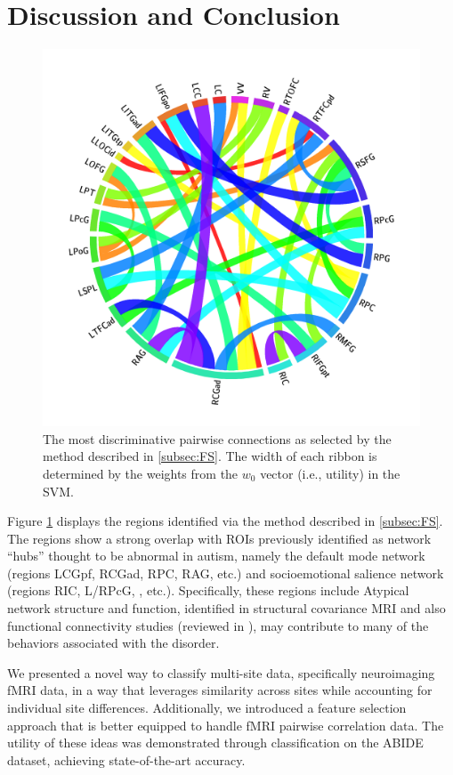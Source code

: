 \documentclass{llncs}
\begin{document}
\section{Discussion and Conclusion}
\begin{figure}
	\centering
	\includegraphics[scale = .15]{now_circos3.png}
	\caption{The most discriminative pairwise connections as selected by the method described in \ref{subsec:FS}.  The width of each ribbon is determined by the weights from the $w_0$ vector (i.e., utility) in the SVM. }
	\label{fig:circos}
\end{figure}

Figure \ref{fig:circos} displays the regions identified via the method described in  \ref{subsec:FS}.  The regions show a strong overlap with ROIs previously identified as network “hubs” thought to be abnormal in autism, namely the default mode network (regions LCGpf, RCGad, RPC, RAG, etc.)  and socioemotional salience network (regions RIC, L/RPcG, , etc.).  Specifically, these regions include  Atypical network structure and function, identified in structural covariance MRI \cite{zielinski2012scmri} and also functional connectivity studies (reviewed in \cite{jeff2014}), may contribute to many of the behaviors associated with the disorder.

We presented a novel way to classify multi-site data, specifically neuroimaging fMRI data, in a way that leverages similarity across sites while accounting for individual site differences.  Additionally, we introduced a feature selection approach that is better equipped to handle fMRI pairwise correlation data.  The utility of these ideas was demonstrated through classification on the ABIDE dataset, achieving state-of-the-art accuracy. 


{}

\end{document}
